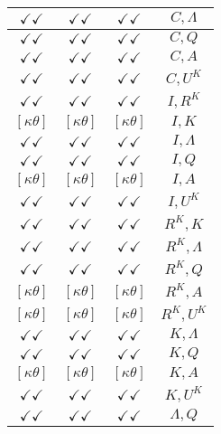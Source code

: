 \documentclass[a4paper,10pt]{article}
\begin{document}
\begin{longtable}{|c|c|c|c|}
\hline
$\checkmark\checkmark$ & $\checkmark\checkmark$ & $\checkmark\checkmark$ & ${C},{\Lambda}$ \\
\hline
$\checkmark\checkmark$ & $\checkmark\checkmark$ & $\checkmark\checkmark$ & ${C},{Q}$ \\
\hline
$\checkmark\checkmark$ & $\checkmark\checkmark$ & $\checkmark\checkmark$ & ${C},{A}$ \\
\hline
$\checkmark\checkmark$ & $\checkmark\checkmark$ & $\checkmark\checkmark$ & ${C},{U^K}$ \\
\hline
$\checkmark\checkmark$ & $\checkmark\checkmark$ & $\checkmark\checkmark$ & ${I},{R^{K}}$ \\
\hline
$[\kappa \theta ]$ & $[\kappa \theta ]$ & $[\kappa \theta ]$ & ${I},{K}$ \\
\hline
$\checkmark\checkmark$ & $\checkmark\checkmark$ & $\checkmark\checkmark$ & ${I},{\Lambda}$ \\
\hline
$\checkmark\checkmark$ & $\checkmark\checkmark$ & $\checkmark\checkmark$ & ${I},{Q}$ \\
\hline
$[\kappa \theta ]$ & $[\kappa \theta ]$ & $[\kappa \theta ]$ & ${I},{A}$ \\
\hline
$\checkmark\checkmark$ & $\checkmark\checkmark$ & $\checkmark\checkmark$ & ${I},{U^K}$ \\
\hline
$\checkmark\checkmark$ & $\checkmark\checkmark$ & $\checkmark\checkmark$ & ${R^{K}},{K}$ \\
\hline
$\checkmark\checkmark$ & $\checkmark\checkmark$ & $\checkmark\checkmark$ & ${R^{K}},{\Lambda}$ \\
\hline
$\checkmark\checkmark$ & $\checkmark\checkmark$ & $\checkmark\checkmark$ & ${R^{K}},{Q}$ \\
\hline
$[\kappa \theta ]$ & $[\kappa \theta ]$ & $[\kappa \theta ]$ & ${R^{K}},{A}$ \\
\hline
$[\kappa \theta ]$ & $[\kappa \theta ]$ & $[\kappa \theta ]$ & ${R^{K}},{U^K}$ \\
\hline
$\checkmark\checkmark$ & $\checkmark\checkmark$ & $\checkmark\checkmark$ & ${K},{\Lambda}$ \\
\hline
$\checkmark\checkmark$ & $\checkmark\checkmark$ & $\checkmark\checkmark$ & ${K},{Q}$ \\
\hline
$[\kappa \theta ]$ & $[\kappa \theta ]$ & $[\kappa \theta ]$ & ${K},{A}$ \\
\hline
$\checkmark\checkmark$ & $\checkmark\checkmark$ & $\checkmark\checkmark$ & ${K},{U^K}$ \\
\hline
$\checkmark\checkmark$ & $\checkmark\checkmark$ & $\checkmark\checkmark$ & ${\Lambda},{Q}$ \\

\end{longtable}
\end{document}
